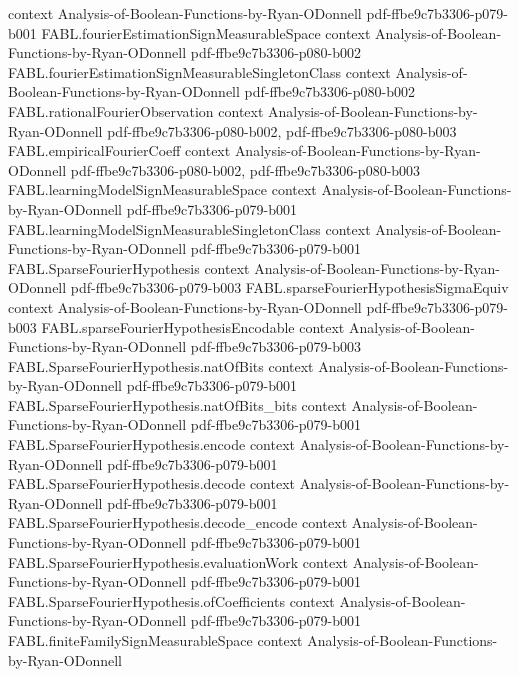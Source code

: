 \begin{theorem}
  {context}
  {Analysis-of-Boolean-Functions-by-Ryan-ODonnell}
  {pdf-ffbe9c7b3306-p079-b001}
\proofstep
  {FABL.fourierEstimationSignMeasurableSpace}
  {context}
  {Analysis-of-Boolean-Functions-by-Ryan-ODonnell}
  {pdf-ffbe9c7b3306-p080-b002}
\proofstep
  {FABL.fourierEstimationSignMeasurableSingletonClass}
  {context}
  {Analysis-of-Boolean-Functions-by-Ryan-ODonnell}
  {pdf-ffbe9c7b3306-p080-b002}
\proofstep
  {FABL.rationalFourierObservation}
  {context}
  {Analysis-of-Boolean-Functions-by-Ryan-ODonnell}
  {pdf-ffbe9c7b3306-p080-b002,
    pdf-ffbe9c7b3306-p080-b003}
\proofstep
  {FABL.empiricalFourierCoeff}
  {context}
  {Analysis-of-Boolean-Functions-by-Ryan-ODonnell}
  {pdf-ffbe9c7b3306-p080-b002,
    pdf-ffbe9c7b3306-p080-b003}
\proofstep
  {FABL.learningModelSignMeasurableSpace}
  {context}
  {Analysis-of-Boolean-Functions-by-Ryan-ODonnell}
  {pdf-ffbe9c7b3306-p079-b001}
\proofstep
  {FABL.learningModelSignMeasurableSingletonClass}
  {context}
  {Analysis-of-Boolean-Functions-by-Ryan-ODonnell}
  {pdf-ffbe9c7b3306-p079-b001}
\proofstep
  {FABL.SparseFourierHypothesis}
  {context}
  {Analysis-of-Boolean-Functions-by-Ryan-ODonnell}
  {pdf-ffbe9c7b3306-p079-b003}
\proofstep
  {FABL.sparseFourierHypothesisSigmaEquiv}
  {context}
  {Analysis-of-Boolean-Functions-by-Ryan-ODonnell}
  {pdf-ffbe9c7b3306-p079-b003}
\proofstep
  {FABL.sparseFourierHypothesisEncodable}
  {context}
  {Analysis-of-Boolean-Functions-by-Ryan-ODonnell}
  {pdf-ffbe9c7b3306-p079-b003}
\proofstep
  {FABL.SparseFourierHypothesis.natOfBits}
  {context}
  {Analysis-of-Boolean-Functions-by-Ryan-ODonnell}
  {pdf-ffbe9c7b3306-p079-b001}
\proofstep
  {FABL.SparseFourierHypothesis.natOfBits_bits}
  {context}
  {Analysis-of-Boolean-Functions-by-Ryan-ODonnell}
  {pdf-ffbe9c7b3306-p079-b001}
\proofstep
  {FABL.SparseFourierHypothesis.encode}
  {context}
  {Analysis-of-Boolean-Functions-by-Ryan-ODonnell}
  {pdf-ffbe9c7b3306-p079-b001}
\proofstep
  {FABL.SparseFourierHypothesis.decode}
  {context}
  {Analysis-of-Boolean-Functions-by-Ryan-ODonnell}
  {pdf-ffbe9c7b3306-p079-b001}
\proofstep
  {FABL.SparseFourierHypothesis.decode_encode}
  {context}
  {Analysis-of-Boolean-Functions-by-Ryan-ODonnell}
  {pdf-ffbe9c7b3306-p079-b001}
\proofstep
  {FABL.SparseFourierHypothesis.evaluationWork}
  {context}
  {Analysis-of-Boolean-Functions-by-Ryan-ODonnell}
  {pdf-ffbe9c7b3306-p079-b001}
\proofstep
  {FABL.SparseFourierHypothesis.ofCoefficients}
  {context}
  {Analysis-of-Boolean-Functions-by-Ryan-ODonnell}
  {pdf-ffbe9c7b3306-p079-b001}
\proofstep
  {FABL.finiteFamilySignMeasurableSpace}
  {context}
  {Analysis-of-Boolean-Functions-by-Ryan-ODonnell}

\end{theorem}
